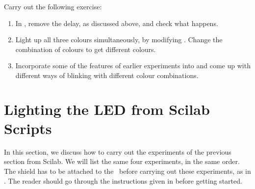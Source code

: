 \begin{exercise}
Carry out the following exercise:
\begin{enumerate}
\item In , remove the delay, as discussed
  above, and check what happens.
\item Light up all three colours simultaneously, by modifying
  .  Change the
  combination of colours to get different colours.
\item Incorporate some of the features of earlier experiments into
   and come up with different ways of blinking
  with different colour combinations.
\end{enumerate}
\end{exercise}

\section{Lighting the LED from Scilab Scripts}
\label{sec:light-sci}
In this section, we discuss how to carry out the experiments of the
previous section from Scilab.  We will list the same four experiments,
in the same order.  The shield has to be attached to the \arduino\
before carrying out these experiments, as in .
The reader should go through the instructions given in
 before getting started.
